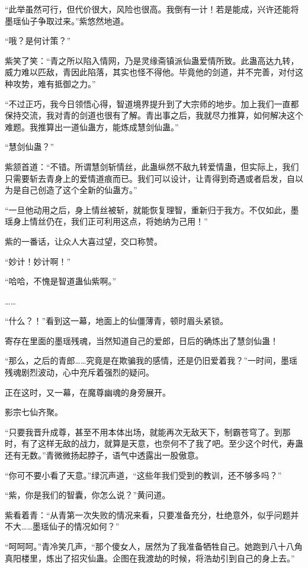 \begin{this_body}
“此举虽然可行，但代价很大，风险也很高。我倒有一计！若是能成，兴许还能将墨瑶仙子争取过来。”紫悠然地道。

“哦？是何计策？”

紫笑了笑：“青之所以陷入情网，乃是灵缘斋镇派仙蛊爱情所致。此蛊高达九转，威力难以匹敌，青因此陷落，其实也怪不得他。毕竟他的剑道，并不完善，对付这种攻势，难有抵御之力。”

“不过正巧，我今日领悟心得，智道境界提升到了大宗师的地步。加上我们一直都保持交流，我对青的剑道也很有了解。青出事之后，我就尽力推算，如何解决这个难题。我推算出一道仙蛊方，能炼成慧剑仙蛊。”

“慧剑仙蛊？”

紫颔首道：“不错。所谓慧剑斩情丝，此蛊纵然不敌九转爱情蛊，但实际上，我们只需要斩去青身上的爱情道痕而已。我们可以设计，让青得到奇遇或者启发，自以为是自己创造了这个全新的仙蛊方。”

“一旦他动用之后，身上情丝被斩，就能恢复理智，重新归于我方。不仅如此，墨瑶身上情丝仍在，我们正可利用这点，将她纳为己用！”

紫的一番话，让众人大喜过望，交口称赞。

“妙计！妙计啊！”

“哈哈，不愧是智道蛊仙紫啊。”

……

“什么？！”看到这一幕，地面上的仙僵薄青，顿时眉头紧锁。

寄存在里面的墨瑶残魂，当然知道自己的爱郎，日后的确炼出了慧剑仙蛊！

“那么，之后的青郎……究竟是在欺骗我的感情，还是仍旧爱着我？”一时间，墨瑶残魂剧烈波动，心中充斥着强烈的疑问。

正在这时，又一幕，在魔尊幽魂的身旁展开。

影宗七仙齐聚。

“只要我晋升成尊，甚至不用本体出场，就能再次无敌天下，制霸苍穹了。到那时，有了这样无敌的战力，就算是天意，也奈何不了我了吧。至少这个时代，寿蛊还有无数。”青微微扬起脖子，语气中透露出一股傲意。

“你可不要小看了天意。”绿沉声道，“这些年我们受到的教训，还不够多吗？”

“紫，你是我们的智囊，你怎么说？”黄问道。

紫看着青：“从青第一次失败的情况来看，只要准备充分，杜绝意外，似乎问题并不大……墨瑶仙子的情况如何？”

“呵呵呵。”青冷笑几声，“那个傻女人，居然为了我准备牺牲自己。她跑到八十八角真阳楼里，炼出了招灾仙蛊。企图在我渡劫的时候，将浩劫引到自己的身上去。”


\end{this_body}
